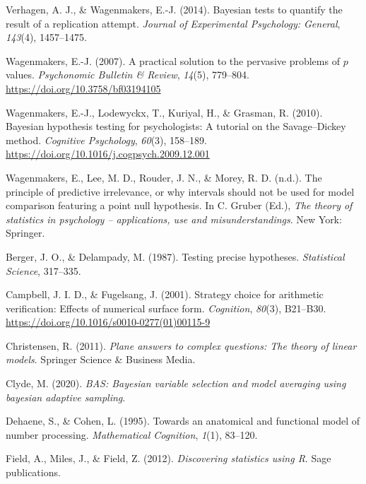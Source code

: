 \documentclass[english,,doc,floatsintext]{apa6}
\begin{document}
\leavevmode\hypertarget{ref-verhagen14bayesian}{}%
Verhagen, A. J., \& Wagenmakers, E.-J. (2014). Bayesian tests to quantify the result of a replication attempt. \emph{Journal of Experimental Psychology: General}, \emph{143}(4), 1457--1475.

\leavevmode\hypertarget{ref-wagenmakers2007}{}%
Wagenmakers, E.-J. (2007). A practical solution to the pervasive problems of \(p\) values. \emph{Psychonomic Bulletin \& Review}, \emph{14}(5), 779--804. \url{https://doi.org/10.3758/bf03194105}

\leavevmode\hypertarget{ref-wagenmakers2010}{}%
Wagenmakers, E.-J., Lodewyckx, T., Kuriyal, H., \& Grasman, R. (2010). Bayesian hypothesis testing for psychologists: A tutorial on the Savage--Dickey method. \emph{Cognitive Psychology}, \emph{60}(3), 158--189. \url{https://doi.org/10.1016/j.cogpsych.2009.12.001}

\leavevmode\hypertarget{ref-WagenmakersEtAlPredictiveIrrelevancesubm}{}%
Wagenmakers, E., Lee, M. D., Rouder, J. N., \& Morey, R. D. (n.d.). The principle of predictive irrelevance, or why intervals should not be used for model comparison featuring a point null hypothesis. In C. Gruber (Ed.), \emph{The theory of statistics in psychology -- applications, use and misunderstandings}. New York: Springer.

\leavevmode\hypertarget{ref-berger1987testing}{}%
Berger, J. O., \& Delampady, M. (1987). Testing precise hypotheses. \emph{Statistical Science}, 317--335.

\leavevmode\hypertarget{ref-campbellFugelsang2001}{}%
Campbell, J. I. D., \& Fugelsang, J. (2001). Strategy choice for arithmetic verification: Effects of numerical surface form. \emph{Cognition}, \emph{80}(3), B21--B30. \url{https://doi.org/10.1016/s0010-0277(01)00115-9}

\leavevmode\hypertarget{ref-christensen2011plane}{}%
Christensen, R. (2011). \emph{Plane answers to complex questions: The theory of linear models}. Springer Science \& Business Media.

\leavevmode\hypertarget{ref-bas}{}%
Clyde, M. (2020). \emph{BAS: Bayesian variable selection and model averaging using bayesian adaptive sampling}.

\leavevmode\hypertarget{ref-dehaeneCohen1995}{}%
Dehaene, S., \& Cohen, L. (1995). Towards an anatomical and functional model of number processing. \emph{Mathematical Cognition}, \emph{1}(1), 83--120.

\leavevmode\hypertarget{ref-field2012discovering}{}%
Field, A., Miles, J., \& Field, Z. (2012). \emph{Discovering statistics using R}. Sage publications.
\end{document}
